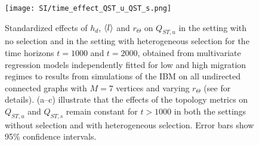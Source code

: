 \FloatBarrier

\begin{figure}[t]
  \centering
    \texttt{[image: SI/time\_effect\_QST\_u\_QST\_s.png]}
    \caption{Standardized effects of $h_d$, $\langle l \rangle$ and $r_\Theta$ on $Q_{ST,u}$ in the setting with no selection and in the setting with heterogeneous selection for the time horizons $t=1000$ and $t=2000$, obtained from multivariate regression models independently fitted for low and high migration regimes to results from simulations of the IBM on all undirected connected graphs with $M=7$ vertices and varying $r_\Theta$ (see  for details). (a--c) illustrate that the effects of the topology metrics on $Q_{ST,u}$ and  $Q_{ST,s}$ remain constant for $t > 1000$ in both the settings without selection and with heterogeneous selection. Error bars show 95\% confidence intervals. }\label{figSI:time_effect_Q_ST_u}
\end{figure}

\FloatBarrier


